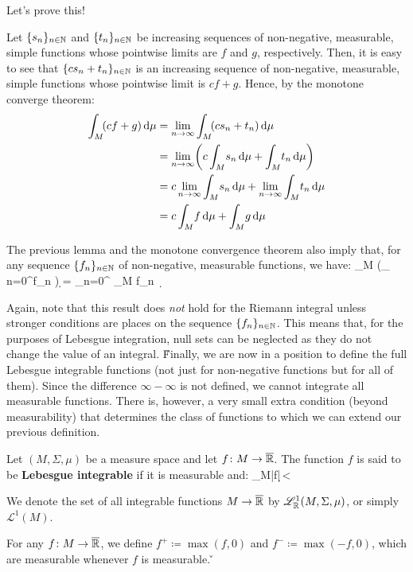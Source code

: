 Let's prove this!

\bq
Let $\{s_n\}_{n\in\mathbb{N}}$ and $\{t_n\}_{n\in\mathbb{N}}$ be increasing sequences of non-negative, measurable, simple functions
whose pointwise limits are $f$ and $g$, respectively. Then, it is easy to see that $\{cs_n+t_n\}_{n\in\mathbb{N}}$ is an
increasing sequence of non-negative, measurable, simple functions whose pointwise limit is $cf+g$. Hence, by the
monotone converge theorem:
{\setlength{\jot}{10pt}
\begin{align*}
\int_M\! (cf+g) \,\d \mu & = \lim_{n\to\infty}\int_M\! (cs_n+t_n) \, \d \mu\\
& = \lim_{n\to\infty}\biggl(c\int_M\! s_n \, \d \mu+\int_M\! t_n \, \d \mu\biggr)\\
& = c\lim_{n\to\infty}\int_M\! s_n \, \d \mu+\lim_{n\to\infty}\int_M\! t_n \, \d \mu\\
& = c\int_{M}\! f \,\d \mu +\int_{M}\! g \,\d \mu
\end{align*}}
\eq

The previous lemma and the monotone convergence theorem also imply that, for any sequence $\{f_n\}_{n\in\mathbb{N}}$ of
non-negative, measurable functions, we have:
\bse
\int_M \biggl(\sum_{\,n=0}^{\infty}f_n \biggr) \d \mu = \sum_{n=0}^{\infty} \int_M \! f_n \, \d \mu
\ese

Again, note that this result does \emph{not} hold for the Riemann integral unless stronger conditions are places on
the sequence $\{f_n\}_{n\in\mathbb{N}}$. This means that, for the purposes of Lebesgue integration, null sets can be
neglected as they do not change the value of an integral. \v

Finally, we are now in a position to define the full Lebesgue integrable functions (not just for non-negative
functions but for all of them). Since the difference $\infty-\infty$ is not defined, we cannot integrate all
measurable functions. There is, however, a very small extra condition (beyond measurability) that determines the
class of functions to which we can extend our previous definition.

Let $(M,\Sigma,\mu)$ be a measure space and let $f\colon M\to\overline{\mathbb{R}}$. The function $f$ is said to be
\textbf{Lebesgue integrable} if it is measurable and:
\bse
\int_{M}\!|f|\,\d \mu < \infty
\ese
\ed

\bd [$\mathscr{L}^1(M)$]
We denote the set of all integrable functions $M\to\overline{\mathbb{R}}$ by $\mathscr{L}^1_{\mathbb{R}}(M,\Sigma,\mu)$, or simply
$\mathscr{L}^1(M)$.
\ed

For any $f\colon M\to \overline{\mathbb{R}}$, we define $f^+ \coloneqq \max(f,0)$ and $f^- \coloneqq \max(-f,0)$, which are
measurable whenever $f$ is measurable. \v

